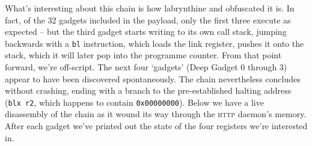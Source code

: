 What's interesting about this chain is how labrynthine and
obfuscated it is. In fact, of the 32 gadgets included in the
payload, only the first three execute as expected -- but the
third gadget starts writing to its own call stack, jumping
backwards with a \texttt{bl} instruction, which loads the link
register, pushes it onto the stack, which it will later pop into
the programme counter. From that point forward, we're off-script.
The next four `gadgets' (Deep Gadget 0 through 3) appear to have
been discovered spontaneously. The chain nevertheless concludes
without crashing, ending with a branch to the pre-established
halting address (\texttt{blx r2}, which happens to contain
\texttt{0x00000000}).  Below we have a live disassembly of the
chain as it wound its way through the \textsc{http} daemon's
memory. After each gadget we've printed out the state of the four
registers we're interested in.

